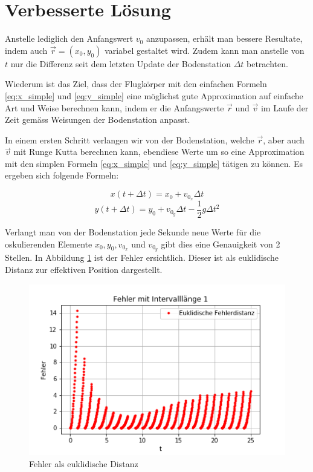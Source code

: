 \section{Verbesserte Lösung
\label{perturbation:section:verbesserte_loesung}}

Anstelle lediglich den Anfangswert $v_0$ anzupassen, erhält man bessere Resultate, indem auch $\vec{r} = (x_0, y_0)$ variabel gestaltet wird. 
Zudem kann man anstelle von $t$ nur die Differenz seit dem letzten Update der Bodenstation $\Delta t$ betrachten.

Wiederum ist das Ziel, dass der Flugkörper mit den einfachen Formeln \ref{eq:x_simple} und \ref{eq:y_simple} eine möglichst gute Approximation auf einfache Art und Weise berechnen kann, indem er die Anfangswerte $\vec{r}$ und $\vec{v}$ im Laufe der Zeit gemäss Weisungen der Bodenstation anpasst.

In einem ersten Schritt verlangen wir von der Bodenstation, welche $\vec{r}$, aber auch $\vec{v}$ mit Runge Kutta berechnen kann, ebendiese Werte um so eine Approximation mit den simplen Formeln \ref{eq:x_simple} und \ref{eq:y_simple} tätigen zu können. Es ergeben sich folgende Formeln:

\begin{equation}
    x(t + \Delta t) = x_0 + v_{0_x}\Delta t
\end{equation}
\begin{equation}
    y(t + \Delta t) = y_0 + v_{0_y}\Delta t - \frac{1}{2}g\Delta t^2
\end{equation}

Verlangt man von der Bodenstation jede Sekunde neue Werte für die oskulierenden Elemente $x_0, y_0, v_{0_x}$ und $v_{0_y}$ gibt dies eine Genauigkeit von 2 Stellen. In Abbildung \ref{error} ist der Fehler ersichtlich. Dieser ist als euklidische Distanz zur effektiven Position dargestellt.

\begin{figure}
    \centering
    \includegraphics[scale = 0.7]{papers/perturbation/bilder/Ansatz2_Ordnung0_Errors.png}
    \caption{Fehler als euklidische Distanz}
	\label{error}
\end{figure}